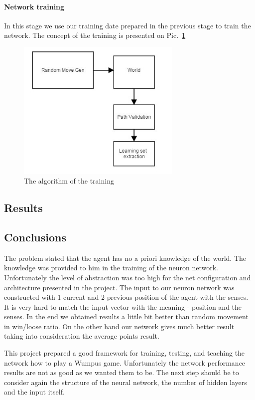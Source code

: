 \documentclass[a4paper]{article}
\begin{document}
	\paragraph{Network training}
	In this stage we use our training date prepared in the previous stage to train the network.
	The concept of the training is presented on Pic.~\ref{pic:trainDataAuto}
	 \begin{figure}[!h]
		\centering	
		\includegraphics[width=0.7\textwidth]{pic/trainDataAuto.jpg}
		\caption{The algorithm of the training}
		\label{pic:trainDataAuto}
	\end{figure}
	
	 

	\subsection{Results}
	
	\subsection{Conclusions}
	The problem stated that the agent has no a priori knowledge of the world. The knowledge was provided to him in the training of the neuron network. Unfortunately the level of abstraction was too high for the net configuration and architecture presented in the project. The input to our neuron network was constructed with 1 current and 2 previous position of the agent with the senses. It is very hard to match the input vector with the meaning - position and the senses. In the end we obtained results a little bit better than random movement in win/loose ratio. On the other hand our network gives much better result taking into consideration the average points result. 
	
This project prepared a good framework for training, testing, and teaching the network how to play a Wumpus game. Unfortunately the network performance results are not as good as we wanted them to be. The next step should be to consider again the structure of the neural network, the number of hidden layers and the input itself.	
\end{document}
